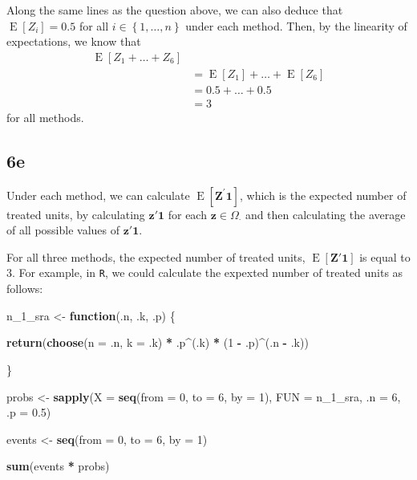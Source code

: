 \documentclass[
  12pt,
  leqno]{article}
\newenvironment{Shaded}{\begin{snugshade}}{\end{snugshade}}
\newcommand{\ControlFlowTok}[1]{\textcolor[rgb]{0.13,0.29,0.53}{\textbf{#1}}}
\newcommand{\DataTypeTok}[1]{\textcolor[rgb]{0.13,0.29,0.53}{#1}}
\newcommand{\DecValTok}[1]{\textcolor[rgb]{0.00,0.00,0.81}{#1}}
\newcommand{\FloatTok}[1]{\textcolor[rgb]{0.00,0.00,0.81}{#1}}
\newcommand{\KeywordTok}[1]{\textcolor[rgb]{0.13,0.29,0.53}{\textbf{#1}}}
\newcommand{\NormalTok}[1]{#1}
\newcommand{\OperatorTok}[1]{\textcolor[rgb]{0.81,0.36,0.00}{\textbf{#1}}}
\newcommand{\StringTok}[1]{\textcolor[rgb]{0.31,0.60,0.02}{#1}}
\DeclareMathOperator{\E}{\mathrm{E}}
\DeclareMathOperator{\1}{\mathbbm{1}}
\begin{document}
Along the same lines as the question above, we can also deduce that
\(\E\left[Z_i\right] = 0.5\) for all
\(i \in \left\{1, \dots , n\right\}\) under each method. Then, by the
linearity of expectations, we know that \begin{align*}
\E\left[Z_1 + \dots + Z_6\right] \\
& = \E\left[Z_1\right] + \dots + \E\left[Z_6\right] \\
& = 0.5 + \dots + 0.5 \\
& = 3
\end{align*} for all methods.

\subsection*{6e}

Under each method, we can calculate
\(\E\left[\mathbf{Z}^{\prime}\mathbf{1}\right]\), which is the expected
number of treated units, by calculating \(\mathbf{z}'\mathbf{1}\) for
each \(\mathbf{z} \in \Omega_{\cdot}\) and then calculating the average
of all possible values of \(\mathbf{z}'\mathbf{1}\).

For all three methods, the expected number of treated units,
\(\E\left[\mathbf{Z}'\mathbf{1}\right]\) is equal to \(3\). For example,
in \texttt{R}, we could calculate the expexted number of treated units
as follows:

\scriptsize

\begin{Shaded}
\begin{Highlighting}[]
\NormalTok{n\_}\DecValTok{1}\NormalTok{\_sra \textless{}{-}}\StringTok{ }\ControlFlowTok{function}\NormalTok{(.n, .k, .p) \{}
    
    \KeywordTok{return}\NormalTok{(}\KeywordTok{choose}\NormalTok{(}\DataTypeTok{n =}\NormalTok{ .n, }\DataTypeTok{k =}\NormalTok{ .k) }\OperatorTok{*}\StringTok{ }\NormalTok{.p}\OperatorTok{\^{}}\NormalTok{(.k) }\OperatorTok{*}\StringTok{ }\NormalTok{(}\DecValTok{1} \OperatorTok{{-}}\StringTok{ }\NormalTok{.p)}\OperatorTok{\^{}}\NormalTok{(.n }\OperatorTok{{-}}\StringTok{ }\NormalTok{.k))}
    
\NormalTok{\}}

\NormalTok{probs \textless{}{-}}\StringTok{ }\KeywordTok{sapply}\NormalTok{(}\DataTypeTok{X =} \KeywordTok{seq}\NormalTok{(}\DataTypeTok{from =} \DecValTok{0}\NormalTok{, }\DataTypeTok{to =} \DecValTok{6}\NormalTok{, }\DataTypeTok{by =} \DecValTok{1}\NormalTok{), }\DataTypeTok{FUN =}\NormalTok{ n\_}\DecValTok{1}\NormalTok{\_sra, }\DataTypeTok{.n =} \DecValTok{6}\NormalTok{, }\DataTypeTok{.p =} \FloatTok{0.5}\NormalTok{)}


\NormalTok{events \textless{}{-}}\StringTok{ }\KeywordTok{seq}\NormalTok{(}\DataTypeTok{from =} \DecValTok{0}\NormalTok{, }\DataTypeTok{to =} \DecValTok{6}\NormalTok{, }\DataTypeTok{by =} \DecValTok{1}\NormalTok{)}

\KeywordTok{sum}\NormalTok{(events }\OperatorTok{*}\StringTok{ }\NormalTok{probs)}
\end{Highlighting}
\end{Shaded}
\end{document}
